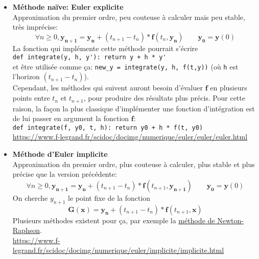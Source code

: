 \documentclass{article}
\newcommand{\myvec}[1]{\ensuremath{\mathbf{#1}}}
\begin{document}
\begin{itemize}
    \item \textbf{Méthode naïve: Euler explicite} \\
    Approximation du premier ordre, peu couteuse à calculer mais peu stable, très imprécise:
    \begin{equation*}
        \forall n \ge 0, \myvec{y_{n+1}} = \myvec{y_n} + (t_{n+1} - t_n) * \myvec{f}(t_n, \myvec{y_n}) \quad\quad \myvec{y_0} = \myvec{y}(0)
    \end{equation*}
    La fonction qui implémente cette méthode pourrait s'écrire\\
    \verb!def integrate(y, h, y'): return y + h * y'!\\
    et être utilisée comme ça: \verb!new_y = integrate(y, h, f(t,y))! (où \verb!h! est l'horizon $(t_{n+1}-t_n)$). \\
    Cependant, les méthodes qui suivent auront besoin d'évaluer $\myvec{f}$ en plusieurs points entre $t_n$ et $t_{n+1}$, pour produire des résultats plus précis. Pour cette raison, la façon la plus classique d'implémenter une fonction d'intégration est de lui passer en argument la fonction $\myvec{f}$:\\
    \verb!def integrate(f, y0, t, h): return y0 + h * f(t, y0)!\\
    \url{https://www.f-legrand.fr/scidoc/docimg/numerique/euler/euler/euler.html}

    \item \textbf{Méthode d'Euler implicite} \\
    Approximation du premier ordre, plus couteuse à calculer, plus stable et plus précise que la version précédente:
    \begin{equation*}
        \forall n \ge 0, \myvec{y_{n+1}} = \myvec{y_n} + (t_{n+1} - t_n) * \myvec{f}(t_{n+1}, \myvec{y_{n+1}}) \quad\quad \myvec{y_0} = \myvec{y}(0)
    \end{equation*}
    On cherche $y_{n+1}$ le point fixe de la fonction
        \[\myvec{G}(\myvec{x}) = \myvec{y_n} + (t_{n+1} - t_n) * \myvec{f}(t_{n+1}, \myvec{x})\]
    Plusieurs méthodes existent pour ça, par exemple la \href{https://en.wikipedia.org/wiki/Newton\%27s_method}{méthode de Newton-Raphson}. \\
    \url{https://www.f-legrand.fr/scidoc/docimg/numerique/euler/implicite/implicite.html}


\end{itemize}
\end{document}
